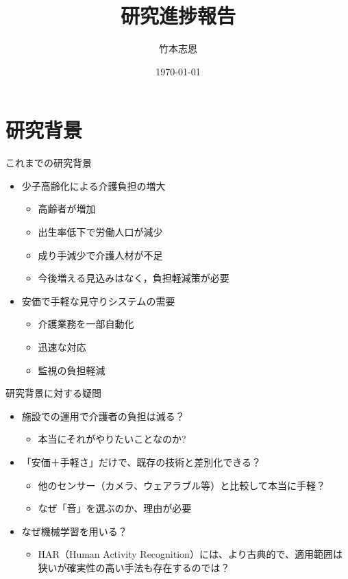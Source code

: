 \documentclass[unicode,12pt,aspectratio=169,dvipdfmx]{beamer}
\title{\textbf{研究進捗報告}}
\author{竹本志恩}
\date{\today}
\begin{document}
\begin{frame}
  \titlepage
\end{frame}

\section{研究背景}
\begin{frame}{これまでの研究背景}
    \begin{itemize}
        \item 少子高齢化による介護負担の増大
        \begin{itemize}
            \item 高齢者が増加
            \item 出生率低下で労働人口が減少
            \item 成り手減少で介護人材が不足
            \item 今後増える見込みはなく，負担軽減策が必要
        \end{itemize}
        \item 安価で手軽な見守りシステムの需要
        \begin{itemize}
            \item 介護業務を一部自動化
            \item 迅速な対応
            \item 監視の負担軽減
        \end{itemize}
    \end{itemize}
\end{frame}

\begin{frame}{研究背景に対する疑問}
  \begin{itemize}
    \item 施設での運用で介護者の負担は減る？
    \begin{itemize}
        \item 本当にそれがやりたいことなのか?
    \end{itemize}
    \item 「安価＋手軽さ」だけで、既存の技術と差別化できる？
    \begin{itemize}
        \item 他のセンサー（カメラ、ウェアラブル等）と比較して本当に手軽？
        \item なぜ「音」を選ぶのか、理由が必要
    \end{itemize}
    \item なぜ機械学習を用いる？
    \begin{itemize}
        \item HAR（Human Activity Recognition）には、より古典的で、適用範囲は狭いが確実性の高い手法も存在するのでは？
    \end{itemize}
  \end{itemize}
\end{frame}
\end{document}
